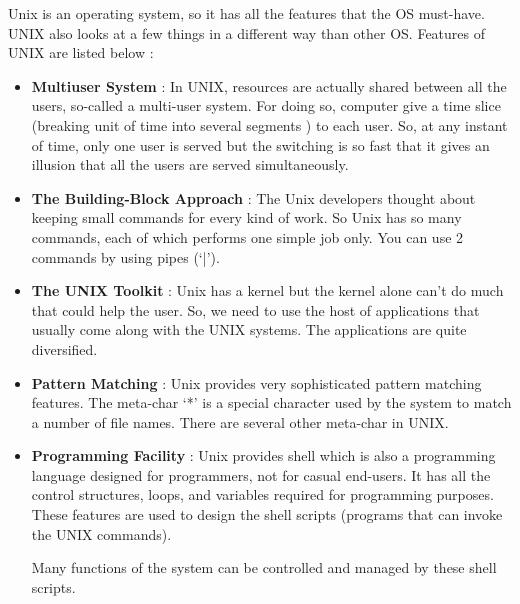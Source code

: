\documentclass{article}
\newenvironment{problem}{\begin{enumerate}[label=\bfseries\alph*.]\large\bfseries}{\end{enumerate}}
\newenvironment{answered}{\par\normalfont}{}
\begin{document}
\begin{problem}
\begin{answered}
            Unix is an operating system, so it has all the features that the OS must-have. UNIX also looks at a few things in a different way than other OS. Features of UNIX are listed below :
            \begin{itemize}
                \item \textbf{Multiuser System} : In UNIX, resources are actually shared between all the users, so-called a multi-user system. For doing so, computer give a time slice (breaking unit of time into several segments ) to each user. So, at any instant of time, only one user is served but the switching is so fast that it gives an illusion that all the users are served simultaneously. 

                \item \textbf{The Building-Block Approach} : The Unix developers thought about keeping small commands for every kind of work. So Unix has so many commands, each of which performs one simple job only. You can use 2 commands by using pipes (‘|’).

                \item \textbf{The UNIX Toolkit} : Unix has a kernel but the kernel alone can’t do much that could help the user. So, we need to use the host of applications that usually come along with the UNIX systems. The applications are quite diversified.

                \item \textbf{Pattern Matching} : Unix provides very sophisticated pattern matching features. The meta-char ‘*’ is a special character used by the system to match a number of file names. There are several other meta-char in UNIX.
                
                \item \textbf{Programming Facility} : Unix provides shell which is also a programming language designed for programmers, not for casual end-users. It has all the control structures, loops, and variables required for programming purposes. These features are used to design the shell scripts (programs that can invoke the UNIX commands).

                Many functions of the system can be controlled and managed by these shell scripts.
            \end{itemize}
            
         \end{answered}
    

\end{problem}
\end{document}

